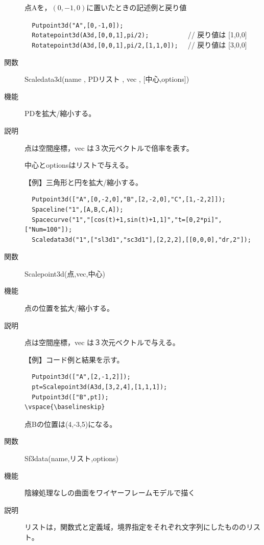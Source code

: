 \documentclass[papersize,a4paper,12pt,uplatex]{jsarticle}
\begin{document}
\begin{description}
点Aを，$(0,-1,0)$に置いたときの記述例と戻り値
 
\verb|  Putpoint3d("A",[0,-1,0]);| \\
\verb|  Rotatepoint3d(A3d,[0,0,1],pi/2);          |  // 戻り値は [1,0,0]\\
\verb|  Rotatepoint3d(A3d,[0,0,1],pi/2,[1,1,0]);  | // 戻り値は [3,0,0]\\
 
\vspace{\baselineskip}
\hypertarget{scaledata3d}{}
\item[関数]  Scaledata3d(name , PDリスト , vec , [中心,options])
\item[機能]  PDを拡大/縮小する。
\item[説明]  点は空間座標，vec は３次元ベクトルで倍率を表す。

中心とoptionsはリストで与える。

\vspace{\baselineskip}
【例】三角形と円を拡大/縮小する。

\begin{verbatim}
  Putpoint3d(["A",[0,-2,0],"B",[2,-2,0],"C",[1,-2,2]]);
  Spaceline("1",[A,B,C,A]);
  Spacecurve("1","[cos(t)+1,sin(t)+1,1]","t=[0,2*pi]",["Num=100"]);
  Scaledata3d("1",["sl3d1","sc3d1"],[2,2,2],[[0,0,0],"dr,2"]);
\end{verbatim}

\hspace{20mm}

\vspace{\baselineskip}
\hypertarget{scalepoint3d}{}
\item[関数]  Scalepoint3d(点,vec,中心)
\item[機能]  点の位置を拡大/縮小する。
\item[説明]  点は空間座標，vec は３次元ベクトルで与える。

\vspace{\baselineskip}
【例】コード例と結果を示す。

\begin{verbatim}
  Putpoint3d(["A",[2,-1,2]]);
  pt=Scalepoint3d(A3d,[3,2,4],[1,1,1]); 
  Putpoint3d(["B",pt]);
\vspace{\baselineskip}
\end{verbatim}

点Bの位置は(4,-3,5)になる。
\vspace{\baselineskip}
\hypertarget{sf3data}{}
\item[関数]  Sf3data(name,リスト,options)
\item[機能]  陰線処理なしの曲面をワイヤーフレームモデルで描く
\item[説明]  リストは，関数式と定義域，境界指定をそれぞれ文字列にしたもののリスト。


\end{description}
\end{document}
